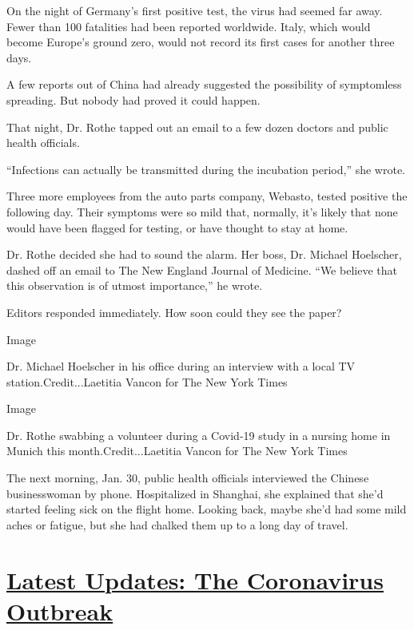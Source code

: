 On the night of Germany's first positive test, the virus had seemed far
away. Fewer than 100 fatalities had been reported worldwide. Italy,
which would become Europe's ground zero, would not record its first
cases for another three days.

A few reports out of China had already suggested the possibility of
symptomless spreading. But nobody had proved it could happen.

That night, Dr. Rothe tapped out an email to a few dozen doctors and
public health officials.

``Infections can actually be transmitted during the incubation period,''
she wrote.

Three more employees from the auto parts company, Webasto, tested
positive the following day. Their symptoms were so mild that, normally,
it's likely that none would have been flagged for testing, or have
thought to stay at home.

Dr. Rothe decided she had to sound the alarm. Her boss, Dr. Michael
Hoelscher, dashed off an email to The New England Journal of Medicine.
``We believe that this observation is of utmost importance,'' he wrote.

Editors responded immediately. How soon could they see the paper?

Image

Dr. Michael Hoelscher in his office during an interview with a local TV
station.Credit...Laetitia Vancon for The New York Times

Image

Dr. Rothe swabbing a volunteer during a Covid-19 study in a nursing home
in Munich this month.Credit...Laetitia Vancon for The New York Times

The next morning, Jan. 30, public health officials interviewed the
Chinese businesswoman by phone. Hospitalized in Shanghai, she explained
that she'd started feeling sick on the flight home. Looking back, maybe
she'd had some mild aches or fatigue, but she had chalked them up to a
long day of travel.

\hypertarget{latest-updates-the-coronavirus-outbreak}{%
\section{\texorpdfstring{\href{https://www.nytimes3xbfgragh.onion/2020/08/21/world/covid-19-coronavirus.html?action=click\&pgtype=Article\&state=default\&region=MAIN_CONTENT_1\&context=storylines_live_updates}{Latest
Updates: The Coronavirus
Outbreak}}{Latest Updates: The Coronavirus Outbreak}}\label{latest-updates-the-coronavirus-outbreak}}

